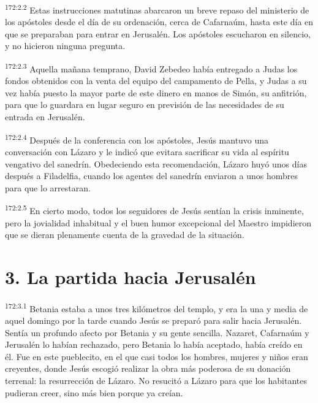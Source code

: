 \par
\textsuperscript{172:2.2} Estas instrucciones matutinas abarcaron un breve repaso del ministerio de los apóstoles desde el día de su ordenación, cerca de Cafarnaúm, hasta este día en que se preparaban para entrar en Jerusalén. Los apóstoles escucharon en silencio, y no hicieron ninguna pregunta.

\par
\textsuperscript{172:2.3} Aquella mañana temprano, David Zebedeo había entregado a Judas los fondos obtenidos con la venta del equipo del campamento de Pella, y Judas a su vez había puesto la mayor parte de este dinero en manos de Simón, su anfitrión, para que lo guardara en lugar seguro en previsión de las necesidades de su entrada en Jerusalén.

\par
\textsuperscript{172:2.4} Después de la conferencia con los apóstoles, Jesús mantuvo una conversación con Lázaro y le indicó que evitara sacrificar su vida al espíritu vengativo del sanedrín. Obedeciendo esta recomendación, Lázaro huyó unos días después a Filadelfia, cuando los agentes del sanedrín enviaron a unos hombres para que lo arrestaran.

\par
\textsuperscript{172:2.5} En cierto modo, todos los seguidores de Jesús sentían la crisis inminente, pero la jovialidad inhabitual y el buen humor excepcional del Maestro impidieron que se dieran plenamente cuenta de la gravedad de la situación.

\section*{3. La partida hacia Jerusalén}
\par
\textsuperscript{172:3.1} Betania estaba a unos tres kilómetros del templo, y era la una y media de aquel domingo por la tarde cuando Jesús se preparó para salir hacia Jerusalén. Sentía un profundo afecto por Betania y su gente sencilla. Nazaret, Cafarnaúm y Jerusalén lo habían rechazado, pero Betania lo había aceptado, había creído en él. Fue en este pueblecito, en el que casi todos los hombres, mujeres y niños eran creyentes, donde Jesús escogió realizar la obra más poderosa de su donación terrenal: la resurrección de Lázaro. No resucitó a Lázaro para que los habitantes pudieran creer, sino más bien porque ya creían.

